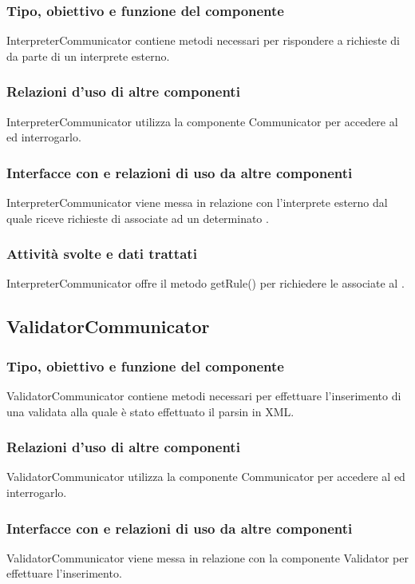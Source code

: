\documentclass[11pt,titlepage,a4paper]{report}
\begin{document}
\subsubsection{Tipo, obiettivo e funzione del componente}
InterpreterCommunicator contiene metodi necessari per rispondere a richieste di \br da parte di un interprete esterno.
\subsubsection{Relazioni d'uso di altre componenti}
InterpreterCommunicator utilizza la componente Communicator per accedere al \re ed interrogarlo.
\subsubsection{Interfacce con e relazioni di uso da altre componenti}
InterpreterCommunicator viene messa in relazione con l'interprete esterno dal quale riceve richieste di \brs associate ad un determinato \bo.
\subsubsection{Attivit\`a svolte e dati trattati}
InterpreterCommunicator offre il metodo getRule() per richiedere le \br associate al \bo.

\subsection{ValidatorCommunicator}
\subsubsection{Tipo, obiettivo e funzione del componente}
ValidatorCommunicator contiene metodi necessari per effettuare l'inserimento di una \br validata alla quale \`e stato effettuato il parsin in XML.
\subsubsection{Relazioni d'uso di altre componenti}
ValidatorCommunicator utilizza la componente Communicator per accedere al \re ed interrogarlo.
\subsubsection{Interfacce con e relazioni di uso da altre componenti}
ValidatorCommunicator viene messa in relazione con la componente Validator per effettuare l'inserimento.
\end{document}
